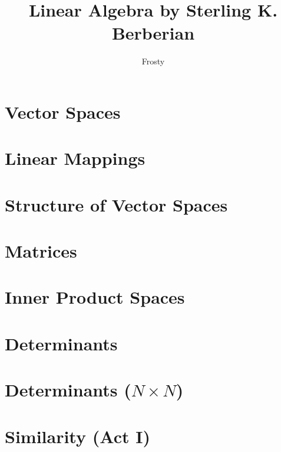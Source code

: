 \documentclass[10pt]{article}  %
\title{Linear Algebra by Sterling K. Berberian}
\author{Frosty}
\begin{document}
\maketitle

\tableofcontents

\section{Vector Spaces}

\section{Linear Mappings}

\section{Structure of Vector Spaces}

\section{Matrices}

\section{Inner Product Spaces}

\section{Determinants}

\section{Determinants ($N \times N$)}

\section{Similarity (Act I)}

\end{document}
